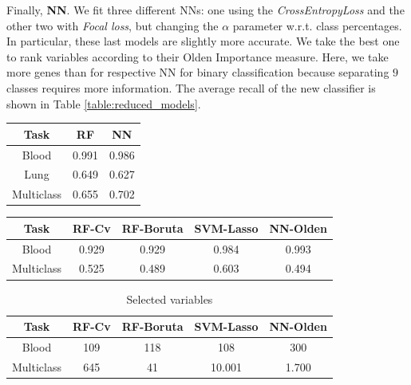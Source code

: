\documentclass[a4paper,11pt, oneside]{article}  %
\begin{document}
Finally, \textbf{NN}. We fit three different NNs: one using the \textit{CrossEntropyLoss} and the other two with \textit{Focal loss}, but changing the $\alpha$ parameter w.r.t. class percentages. In particular, these last models are slightly more accurate. We take the best one to rank variables according to their Olden Importance measure. Here, we take more genes than for respective NN for binary classification because separating $9$ classes requires more information. The average recall of the new classifier is shown in Table \ref{table:reduced_models}.
\bigskip

\begin{minipage}[c]{0.4\textwidth}
	\centering
	\begin{tabular}{c c c}
		\hline\hline
		Task & RF & NN \\ [0.5ex] %
		\hline
		Blood & 0.991  & 0.986 \\
		Lung & 0.649  & 0.627 \\
		Multiclass & 0.655 & 0.702 \\ [1ex]
		\hline
	\end{tabular}
	\label{table:big_models}
\end{minipage}
\hspace{0.3cm}
\begin{minipage}[c]{0.5\textwidth}
	\centering
	\begin{tabular}{c c c c c}
		\hline\hline
		Task & RF-Cv & RF-Boruta & SVM-Lasso & NN-Olden \\ [0.5ex]
		\hline
		Blood & 0.929 & 0.929 & 0.984 & 0.993 \\
		Multiclass & 0.525 & 0.489 & 0.603 & 0.494 \\ [1ex]
		\hline
	\end{tabular}
	\label{table:reduced_models}
\end{minipage}
\bigskip

\begin{table}[h!]
	\centering
	\begin{tabular}{c c c c c}
		\hline\hline
		Task & RF-Cv &  RF-Boruta & SVM-Lasso & NN-Olden \\ [0.5ex] 
		\hline
		Blood & 109 & 118 & 108 & 300 \\
		Multiclass & 645 &  41 & 10.001 & 1.700 \\ [1ex]
		\hline
	\end{tabular}
	\caption{Selected variables}
	\label{table:selected variables}
\end{table}
\end{document}
